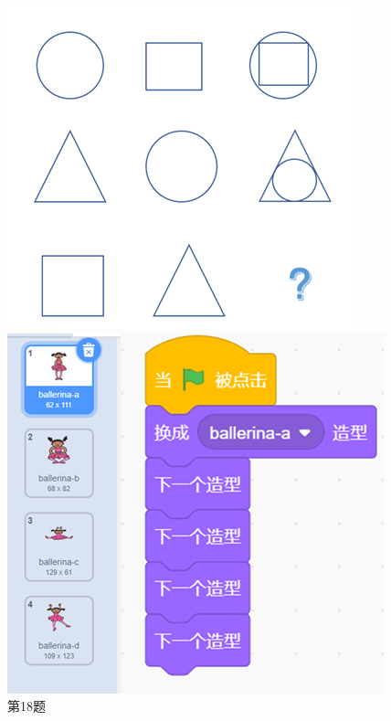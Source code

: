 \documentclass[10.5pt, a4paper]{article}
\begin{document}
\begin{enumerate}
        \begin{figure}[htbp]
            \centering
            \begin{minipage}[t]{.22\textwidth}
                \centering
                \includegraphics[width=\textwidth]{18.png}
                \caption*{第18题}
            \end{minipage}
            \begin{minipage}[t]{.21\textwidth}
                \centering
                \includegraphics[width=\textwidth]{19.png}

\end{minipage}
\end{figure}
\end{enumerate}
\end{document}
